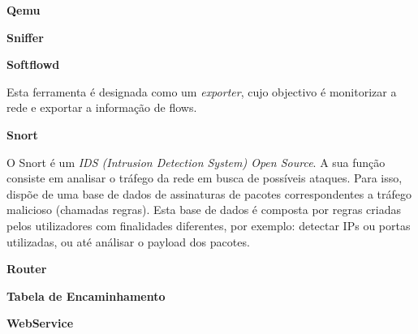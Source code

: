 \begin{description}
    \item \textbf{Qemu}
\end{description}

\begin{description}
    \item \textbf{Sniffer}
\end{description}

\begin{description}
    \item \textbf{Softflowd}

Esta ferramenta é designada como um \textit{exporter}, cujo objectivo é monitorizar a rede e exportar a informação de flows.
\end{description}

\begin{description}
    \item \textbf{Snort}

O Snort é um \textit{IDS (Intrusion Detection System) Open Source}. A sua função consiste em analisar o tráfego da rede em busca de possíveis ataques. Para isso, dispõe de uma base de dados de assinaturas de pacotes correspondentes a tráfego malicioso (chamadas regras). Esta base de dados é composta por regras criadas pelos utilizadores com finalidades diferentes, por exemplo: detectar IPs ou portas utilizadas, ou até análisar o payload dos pacotes.
\end{description}

\begin{description}
    \item \textbf{Router}
\end{description}

\begin{description}
    \item \textbf{Tabela de Encaminhamento}
\end{description}

\begin{description}
    \item \textbf{WebService}
\end{description}
